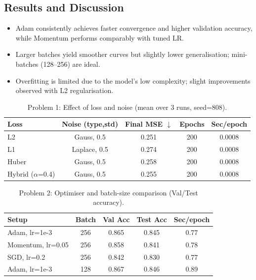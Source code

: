 \documentclass{article}
\begin{document}
\subsection{Results and Discussion}
\begin{itemize}
    \item Adam consistently achieves faster convergence and higher validation accuracy, while Momentum performs comparably with tuned LR.
    \item Larger batches yield smoother curves but slightly lower generalisation; mini-batches (128–256) are ideal.
    \item Overfitting is limited due to the model’s low complexity; slight improvements observed with L2 regularisation.
\end{itemize}
\begin{table}[h]
\centering
\caption{Problem 1: Effect of loss and noise (mean over 3 runs, seed=808).}
\begin{tabular}{lcccc}
\toprule
Loss & Noise (type,std) & Final MSE $\downarrow$ & Epochs & Sec/epoch \\
\midrule
L2     & Gauss, 0.5 & 0.251 & 200 & 0.0008 \\
L1     & Laplace, 0.5 & 0.274 & 200 & 0.0008 \\
Huber  & Gauss, 0.5 & 0.258 & 200 & 0.0008 \\
Hybrid ($\alpha$=0.4) & Gauss, 0.5 & 0.255 & 200 & 0.0008 \\
\bottomrule
\end{tabular}
\end{table}

\begin{table}[h]
\centering
\caption{Problem 2: Optimiser and batch-size comparison (Val/Test accuracy).}
\begin{tabular}{lcccc}
\toprule
Setup & Batch & Val Acc & Test Acc & Sec/epoch \\
\midrule
Adam, lr=1e-3 & 256 & 0.865 & 0.845 & 0.77 \\
Momentum, lr=0.05 & 256 & 0.858 & 0.841 & 0.78 \\
SGD, lr=0.2 & 256 & 0.842 & 0.830 & 0.77 \\
Adam, lr=1e-3 & 128 & 0.867 & 0.846 & 0.89 \\
\bottomrule
\end{tabular}
\end{table}
\end{document}
